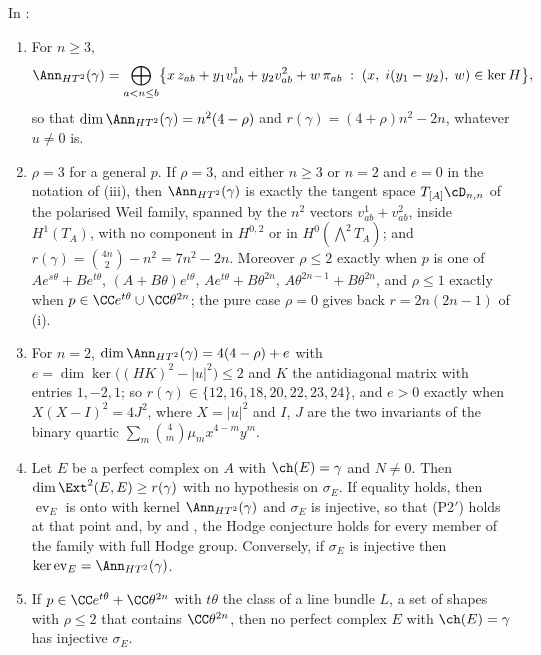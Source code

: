 \begin{theorem}\label{thm:p2primenumber}
In :
\begin{enumerate}[label=\textup{(\roman*)},leftmargin=2.6em,itemsep=2pt]
\item For $n\ge3$,
  \[
    \Ann_{HT^{2}}(\gamma)=\bigoplus_{a<n\le b}
    \bigl\{x\,z_{ab}+y_{1}v^{1}_{ab}+y_{2}v^{2}_{ab}+w\,\pi_{ab}\;:\;
      (x,\;i(y_{1}-y_{2}),\;w)\in\ker H\bigr\},
  \]
  so that $\dim\Ann_{HT^{2}}(\gamma)=n^{2}(4-\rho)$ and
  $r(\gamma)=(4+\rho)n^{2}-2n$, whatever $u\ne0$ is.
\item $\rho=3$ for a general $p$. If $\rho=3$, and either $n\ge3$ or $n=2$ and
  $e=0$ in the notation of (iii), then $\Ann_{HT^{2}}(\gamma)$ is exactly
  the tangent space $T_{[A]}\cD_{n,n}$ of the polarised Weil family, spanned
  by the $n^{2}$ vectors $v^{1}_{ab}+v^{2}_{ab}$, inside $H^{1}(T_{A})$, with
  no component in $H^{0,2}$ or in $H^{0}(\bigwedge^{2}T_{A})$; and
  $r(\gamma)=\binom{4n}{2}-n^{2}=7n^{2}-2n$. Moreover $\rho\le2$ exactly when
  $p$ is one of $Ae^{s\theta}+Be^{t\theta}$, $(A+B\theta)e^{t\theta}$,
  $Ae^{t\theta}+B\theta^{2n}$, $A\theta^{2n-1}+B\theta^{2n}$, and $\rho\le1$
  exactly when $p\in\CC e^{t\theta}\cup\CC\theta^{2n}$; the pure case
  $\rho=0$ gives back $r=2n(2n-1)$ of (i).
\item For $n=2$, $\dim\Ann_{HT^{2}}(\gamma)=4(4-\rho)+e$ with
  $e=\dim\ker\bigl((HK)^{2}-|u|^{2}\bigr)\le2$ and $K$ the antidiagonal
  matrix with entries $1,-2,1$; so $r(\gamma)\in\{12,16,18,20,22,23,24\}$,
  and $e>0$ exactly when $X(X-I)^{2}=4J^{2}$, where $X=|u|^{2}$ and $I$, $J$
  are the two invariants of the binary quartic
  $\sum_{m}\binom{4}{m}\mu_{m}x^{4-m}y^{m}$.
\item Let $E$ be a perfect complex on $A$ with $\ch(E)=\gamma$ and $N\ne0$.
  Then $\dim\Ext^{2}(E,E)\ge r(\gamma)$ with no hypothesis on $\sigma_{E}$.
  If equality holds, then $\operatorname{ev}_{E}$ is onto with kernel
  $\Ann_{HT^{2}}(\gamma)$ and $\sigma_{E}$ is injective, so that
  \textup{(P2$'$)} holds at that point and, by  and
  , the Hodge conjecture holds for every member of
  the family with full Hodge group. Conversely, if $\sigma_{E}$ is injective
  then $\ker\operatorname{ev}_{E}=\Ann_{HT^{2}}(\gamma)$.
\item If $p\in\CC e^{t\theta}+\CC\theta^{2n}$ with $t\theta$ the class of a line
  bundle $L$, a set of shapes with $\rho\le2$ that contains
  $\CC\theta^{2n}$, then no perfect complex $E$ with $\ch(E)=\gamma$ has
  injective $\sigma_{E}$.
\end{enumerate}
\end{theorem}

